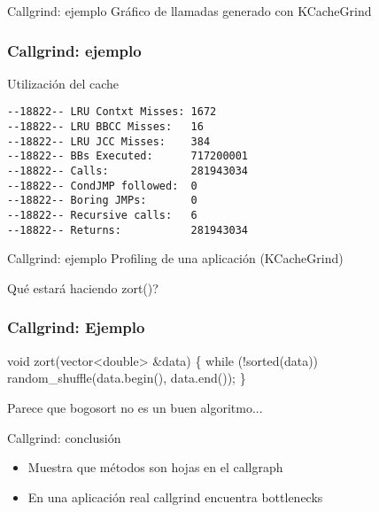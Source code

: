 \documentclass{beamer}
\begin{document}
\begin{frame}{Callgrind: ejemplo}
Gr\'afico de llamadas generado con KCacheGrind
\begin{center}
\end{center}
\end{frame}

\begin{frame}[fragile]
\frametitle{Callgrind: ejemplo}
Utilizaci\'on del cache
\begin{verbatim}
--18822-- LRU Contxt Misses: 1672
--18822-- LRU BBCC Misses:   16
--18822-- LRU JCC Misses:    384
--18822-- BBs Executed:      717200001
--18822-- Calls:             281943034
--18822-- CondJMP followed:  0
--18822-- Boring JMPs:       0
--18822-- Recursive calls:   6
--18822-- Returns:           281943034
\end{verbatim}
\end{frame}

\begin{frame}{Callgrind: ejemplo}
Profiling de una aplicaci\'on (KCacheGrind)
\begin{center}
\end{center}
\rule{0em}{5pt}
\textquestiondown Qu\'e estar\'a haciendo zort()?
\end{frame}

\begin{frame}[fragile]
\frametitle{Callgrind: Ejemplo}
\begin{semiverbatim}
void {\color{green}zort}(vector<double> \&data) \{
  while (!{\color{green}sorted}(data))
    random_shuffle(data.begin(), data.end());
\}
\end{semiverbatim}
\begin{center} Parece que bogosort no es un buen algoritmo... \end{center}
\end{frame}

\begin{frame}{Callgrind: conclusi\'on}
\begin{itemize}
  \item Muestra que m\'etodos son hojas en el callgraph
  \item En una aplicaci\'on real callgrind encuentra bottlenecks
\end{itemize}
\end{frame}
\end{document}
